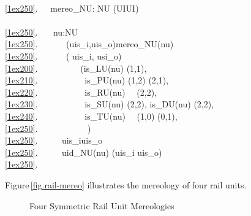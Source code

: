 {%
\bp
{}\ \ \\
\ref{1ex250}.\ \ \ mereo\_NU: NU {\RIGHTARROW} (UIUI)\\
\\
\ref{1ex250}.\ \ \ {\ALL} nu:NU {\RDOT}\ \ \\
\ref{1ex250}.\ \ \ \ \ \  (uis\_i,uis\_o){\EQ}mereo\_NU(nu) \\
\ref{1ex250}.\ \ \ \ \ \  ( uis\_i, usi\_o) {\EQ}\\
\ref{1ex200}.\ \ \ \ \ \ \ \ \ \ (is\_LU(nu) {\RIGHTARROW} (1,1),\\
\ref{1ex210}.\ \ \ \ \ \ \ \ \ \ \ is\_PU(nu) {\RIGHTARROW} (1,2) {\VEE} (2,1),\\
\ref{1ex220}.\ \ \ \ \ \ \ \ \ \ \ is\_RU(nu)\ \ {\RIGHTARROW} (2,2),\\
\ref{1ex230}.\ \ \ \ \ \ \ \ \ \ \ is\_SU(nu) {\RIGHTARROW} (2,2), is\_DU(nu) {\RIGHTARROW} (2,2),\\
\ref{1ex240}.\ \ \ \ \ \ \ \ \ \ \ is\_TU(nu)\ \ {\RIGHTARROW} (1,0) {\VEE} (0,1),\\
\ref{1ex250}.\ \ \ \ \ \ \ \ \ \ \ {\UNDERLINE} {\RIGHTARROW} ) \\
\ref{1ex250}.\ \ \ \ \ {\WEDGE} uis\_i{\INTER}uis\_o{\EQ}{\LBRACE}{\RBRACE} \\
\ref{1ex250}.\ \ \ \ \ {\WEDGE} uid\_NU(nu) {\NOTISIN} (uis\_i {\UNION} uis\_o) \\
\ref{1ex250}.\ \ \ \ \ \ \ \ 
\ep
}

\pos{}{\mnewfoil}
\noindent
\begynd
\pind Figure\,\vref{fig.rail-mereo} 
\begynd
\pind illustrates the mereology of four rail units.
\afslut
\afslut
\begin{figure}[h]
\begin{center}
\caption{Four Symmetric Rail Unit Mereologies\ \ \ \eod}\label{fig.rail-mereo}
\end{center}
\end{figure}

